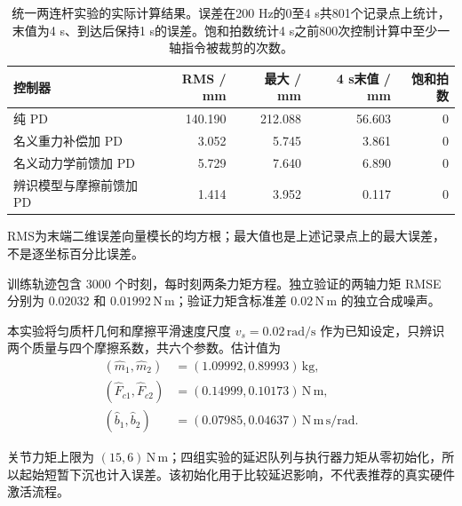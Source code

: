 \begin{table}[htbp]\centering\small
\begin{tabularx}{\linewidth}{Xrrrr}\toprule
控制器 & RMS / mm & 最大 / mm & 4 s末值 / mm & 饱和拍数\\\midrule
纯 PD & 140.190 & 212.088 & 56.603 & 0 \\
名义重力补偿加 PD & 3.052 & 5.745 & 3.861 & 0 \\
名义动力学前馈加 PD & 5.729 & 7.640 & 6.890 & 0 \\
辨识模型与摩擦前馈加 PD & 1.414 & 3.952 & 0.117 & 0 \\
\bottomrule\end{tabularx}
\caption{统一两连杆实验的实际计算结果。误差在200 Hz的0至4 s共801个记录点上统计，末值为4 s、到达后保持1 s的误差。饱和拍数统计4 s之前800次控制计算中至少一轴指令被裁剪的次数。}\end{table}

RMS为末端二维误差向量模长的均方根；最大值也是上述记录点上的最大误差，不是逐坐标百分比误差。

训练轨迹包含 3000 个时刻，每时刻两条力矩方程。独立验证的两轴力矩 RMSE 分别为 $0.02032$ 和 $0.01992\,\mathrm{N\,m}$；验证力矩含标准差 $0.02\,\mathrm{N\,m}$ 的独立合成噪声。

本实验将匀质杆几何和摩擦平滑速度尺度 $v_s=0.02\,\mathrm{rad/s}$ 作为已知设定，只辨识两个质量与四个摩擦系数，共六个参数。估计值为
\[
\begin{aligned}
(\hat m_1,\hat m_2)&=(1.09992,0.89993)\,\mathrm{kg},\\
(\hat F_{c1},\hat F_{c2})&=(0.14999,0.10173)\,\mathrm{N\,m},\\
(\hat b_1,\hat b_2)&=(0.07985,0.04637)\,\mathrm{N\,m\,s/rad}.
\end{aligned}
\]

关节力矩上限为 $(15,6)\,\mathrm{N\,m}$；四组实验的延迟队列与执行器力矩从零初始化，所以起始短暂下沉也计入误差。该初始化用于比较延迟影响，不代表推荐的真实硬件激活流程。

